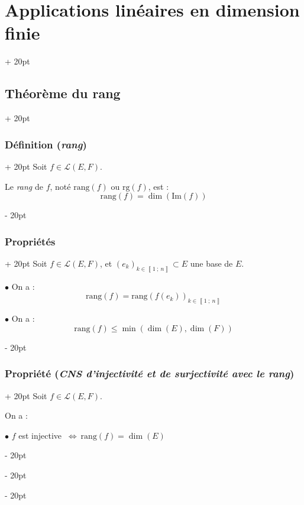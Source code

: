 \documentclass[a4paper, 12pt, twoside]{article}
\newcommand{\nset}[2]{\left\llbracket #1\ ;\ #2 \right\rrbracket}
\newcommand{\lr}[1]{\left( #1 \right)}
\newcommand{\ssi}{\ \Leftrightarrow \ }
\renewcommand{\le}{\leqslant}
\newcommand{\ind}[1][20pt]{\advance\leftskip + #1}
\newcommand{\deind}[1][20pt]{\advance\leftskip - #1}
\newenvironment{indt}[2][20pt]{#2 \par \ind[#1]}{\par \deind} %
\begin{document}
\begin{indt}{\section{Applications linéaires en dimension finie}}
        \vspace{12pt}
        
        \begin{indt}{\subsection{Théorème du rang}}
            \begin{indt}{\subsubsection{Définition (\textit{rang})}}
                Soit $f \in \mathcal L(E, F)$.

                Le \textit{rang} de $f$, noté $\mathrm{rang}(f)$ ou $\mathrm{rg}(f)$, est :
                \[
                    \mathrm{rang}(f) = \dim(\mathrm{Im}(f))
                \]
            \end{indt}

            \vspace{12pt}
            
            \begin{indt}{\subsubsection{Propriétés}}
                Soit $f \in \mathcal L(E, F)$, et $(e_k)_{k \in \nset 1 n} \subset E$ une base de $E$.

                $\bullet$ On a :
                \[
                    \mathrm{rang}(f) = \mathrm{rang}\!\lr{f(e_k)}_{k \in \nset 1 n}
                \]

                $\bullet$ On a :
                \[
                    \mathrm{rang}(f) \le \min\!\lr{\dim(E), \dim(F)}
                \]
            \end{indt}

            \vspace{12pt}
            
            \begin{indt}{\subsubsection{Propriété (\textit{CNS d'injectivité et de surjectivité avec le rang})}}
                Soit $f \in \mathcal L(E, F)$.
                
                On a :

                $\bullet$ $f$ est injective $\ssi \mathrm{rang}(f) = \dim(E)$


\end{indt}
\end{indt}
\end{indt}
\end{document}

